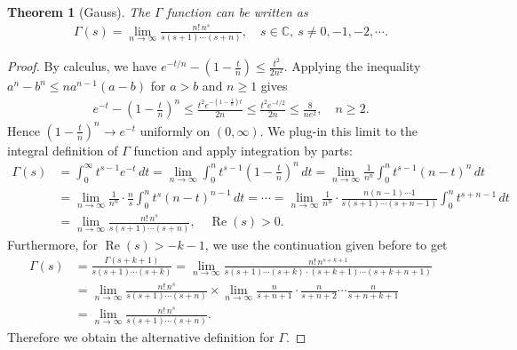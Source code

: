 \documentclass{article}
\numberwithin{equation}{section}
\newcommand{\bbC}{\mathbb{C}}
\DeclareMathOperator{\re}{Re}
\theoremstyle{plain}
\newtheorem{theorem}{Theorem}[section]
\theoremstyle{definition}
\begin{document}
\begin{theorem}[Gauss] The $\Gamma$ function can be written as
	\begin{align}
		\Gamma(s)=\lim_{n\to\infty}\frac{n!\,n^s}{s(s+1)\cdots(s+n)},\quad s\in\bbC,\ s\neq 0,-1,-2,\cdots.\label{gaussgamma}
	\end{align}
\end{theorem}
\begin{proof}
By calculus, we have
$e^{-t/n}-\left(1-\frac{t}{n}\right)\leq\frac{t^2}{2n^2}$. Applying the inequality $a^n-b^n\leq na^{n-1}(a-b)$ for $a>b$ and $n\geq 1$ gives\vspace{-0.1cm}
\begin{align*}
	e^{-t}-\left(1-\frac{t}{n}\right)^n\leq \frac{t^2e^{-(1-\frac{1}{n})t}}{2n}\leq\frac{t^2e^{-t/2}}{2n}\leq\frac{8}{ne^2},\quad n\geq 2.
\end{align*}
Hence $\left(1-\frac{t}{n}\right)^n\to e^{-t}$ uniformly on $(0,\infty)$. We plug-in this limit to the integral definition of $\Gamma$ function and apply integration by parts:
\begin{align*}
	\Gamma(s)&=\int_0^\infty t^{s-1}e^{-t}\,dt=\lim_{n\to\infty}\int_0^n t^{s-1}\left(1-\frac{t}{n}\right)^n\,dt=\lim_{n\to\infty}\frac{1}{n^n}\int_0^n t^{s-1}(n-t)^n\,dt\\
	&=\lim_{n\to\infty}\frac{1}{n^n}\cdot\frac{n}{s}\int_0^n t^s(n-t)^{n-1}\,dt=\cdots=\lim_{n\to\infty}\frac{1}{n^n}\cdot\frac{n(n-1)\cdots 1}{s(s+1)\cdots(s+n-1)}\int_0^n t^{s+n-1}\,dt\\
	&=\lim_{n\to\infty}\frac{n!\,n^s}{s(s+1)\cdots(s+n)},\quad\re(s)>0.
\end{align*}
Furthermore, for $\re(s)>-k-1$, we use the continuation given before to get
\begin{align*}
	\Gamma(s)&=\frac{\Gamma(s+k+1)}{s(s+1)\cdots(s+k)}=\lim_{n\to\infty}\frac{n!\,n^{s+k+1}}{s(s+1)\cdots(s+k)\cdot (s+k+1)\cdots(s+k+n+1)}\\
	&=\lim_{n\to\infty}\frac{n!\,n^s}{s(s+1)\cdots(s+n)}\times\lim_{n\to\infty}\frac{n}{s+n+1}\cdot\frac{n}{s+n+2}\cdots\frac{n}{s+n+k+1}\\
	&=\lim_{n\to\infty}\frac{n!\,n^s}{s(s+1)\cdots(s+n)}.
\end{align*}
Therefore we obtain the alternative definition for $\Gamma$.
\end{proof}
\end{document}
